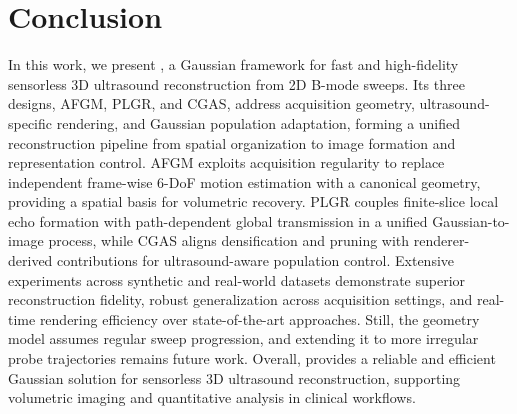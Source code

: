 \vspace{-3mm}
\section{Conclusion}
\label{sec:conclusion}

In this work, we present \methodname{}, a Gaussian framework for fast and
high-fidelity sensorless 3D ultrasound reconstruction from 2D B-mode
sweeps.
Its three designs, AFGM, PLGR, and CGAS, address acquisition
geometry, ultrasound-specific rendering, and Gaussian population adaptation,
forming a unified reconstruction pipeline from spatial organization to image
formation and representation control.
AFGM exploits acquisition regularity to replace independent frame-wise
6-DoF motion estimation with a canonical geometry, providing a
spatial basis for volumetric recovery. PLGR couples finite-slice local echo
formation with path-dependent global transmission in a unified
Gaussian-to-image process, while CGAS aligns densification and pruning with
renderer-derived contributions for ultrasound-aware population control.
Extensive experiments across synthetic and real-world datasets demonstrate
superior reconstruction fidelity, robust generalization across
acquisition settings, and real-time rendering efficiency over state-of-the-art
approaches. Still, the geometry model assumes regular sweep progression,
and extending it to more irregular probe trajectories remains future work.
Overall, \methodname{} provides a reliable and efficient Gaussian solution for
sensorless 3D ultrasound reconstruction, supporting volumetric imaging and
quantitative analysis in clinical workflows.